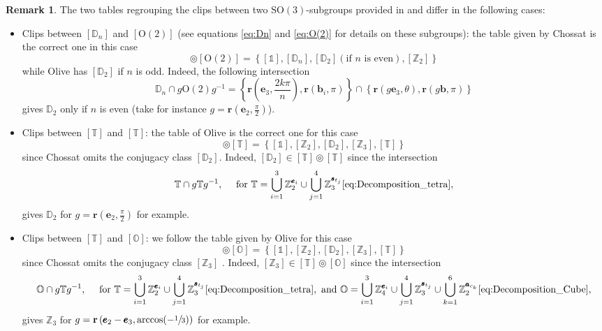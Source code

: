\documentclass[11pt,a4paper]{amsart}
\theoremstyle{definition}
\newtheorem{rem}[thm]{Remark}
\newcommand{\ZZ}{\mathbb{Z}}                %
\newcommand{\OO}{\mathrm{O}}                %
\newcommand{\SO}{\mathrm{SO}}               %
\newcommand{\octa}{\mathbb{O}}              %
\newcommand{\tetra}{\mathbb{T}}             %
\newcommand{\DD}{\mathbb{D}}                %
\newcommand{\1}{\mathds{1}}		            %
\newcommand{\ee}{\pmb{e}}                   %
\newcommand{\vR}{\mathbf{r}}
\newcommand{\bb}{\mathbf{b}}
\newcommand{\set}[1]{\left\{#1\right\}}     %
\begin{document}
\begin{rem}\label{rem:Marc-vs-chossat}
The two tables regrouping the clips between two $\SO(3)$-subgroups provided in \cite[table 1]{Chossat1994} and \cite[Table 1]{Olive2019} differ in the following cases:
\begin{itemize}
	\item Clips between $[\DD_n]$ and $[\OO(2)]$ (see equations \eqref{eq:Dn} and \eqref{eq:O(2)} for details on these subgroups): the table given by Chossat \cite{Chossat1994} is the correct one in this case
	\begin{equation*}
		[\DD_n]\circledcirc [\OO(2)]=\set{[\mathds{1}],[\DD_n],[\DD_2] (\text{if $n$ is even}), [\ZZ_2]}
	\end{equation*}
while Olive \cite{Olive2019} has $[\DD_2]$ if $n$ is odd. Indeed, the following intersection
	\begin{equation*}
	\DD_n\cap g\OO(2)g^{-1}=\set{\vR\left(\ee_3,\frac{2k\pi}{n}\right),\vR(\bb_i,\pi)}\cap \set{\vR(g\ee_3,\theta),\vR(g\bb,\pi)}
	\end{equation*}
gives $\DD_2$ only if $n$ is even (take for instance $g=\vR\left(\ee_2,\frac{\pi}{2}\right)$).

    \item Clips between $[\tetra]$ and $[\tetra]$: the table of Olive \cite[table 1]{Olive2019} is the correct one for this case 
    \begin{equation*}
    	[\tetra]\circledcirc[\tetra]=\set{[\mathds{1}],[\ZZ_2],[\DD_2],[\ZZ_3],[\tetra]}
    \end{equation*}
since Chossat \cite[table 1]{Chossat1994} omits the conjugacy class $[\DD_2]$. Indeed, $[\DD_2]\in [\tetra]\circledcirc [\tetra]$ since the intersection
\begin{equation*}
\tetra \cap g\tetra g^{-1}, \quad \text{ for } \tetra=\bigcup_{i=1}^3\ZZ_2^{\ee_i}\cup\bigcup_{j=1}^4 \ZZ_3^{\pmb{s}_{t_j}} \eqref{eq:Decomposition_tetra},
\end{equation*}
gives $\DD_2$ for $g=\vR\left(\ee_2,\frac{\pi}{2}\right)$ for example.

     \item Clips between $[\tetra]$ and $[\octa]$: we follow the table given by Olive \cite{Olive2019} for this case
     \begin{equation*}
     	[\tetra]\circledcirc[\octa]=\set{[\mathds{1}],[\ZZ_2],[\DD_2],[\ZZ_3],[\tetra]}
     \end{equation*}
 since Chossat \cite{Chossat1994} omits the conjugacy class $[\ZZ_3]$ . Indeed, $[\ZZ_3]\in [\tetra]\circledcirc [\octa]$ since the intersection
     \begin{equation*}
     \octa \cap g\tetra g^{-1}, \quad \text{ for  } \tetra=\bigcup_{i=1}^3\ZZ_2^{\ee_i}\cup\bigcup_{j=1}^4 \ZZ_3^{\pmb{s}_{t_j}} \eqref{eq:Decomposition_tetra},\text{ and }  \octa=\bigcup_{i=1}^3 \ZZ_4^{\ee_i}\cup\bigcup_{j=1}^4 \ZZ_3^{\pmb{s}_{t_j}}\cup\bigcup_{k=1}^6\ZZ_2^{\pmb{a}_{c_k}}\eqref{eq:Decomposition_Cube},
     \end{equation*}
     gives $\ZZ_3$ for $g=\vR\left(\ee_2-\ee_3,\arccos(-\sfrac{1}{3}) \right)$ for example.
     

\end{itemize}
\end{rem}
\end{document}
